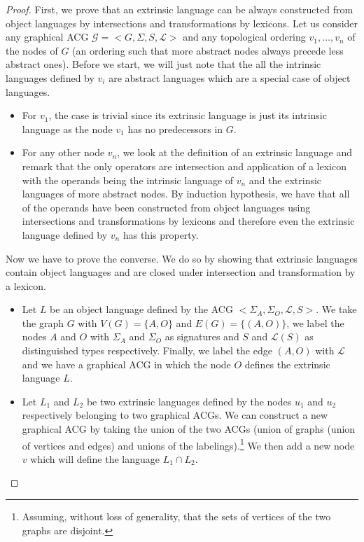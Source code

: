 \begin{proof}
  First, we prove that an extrinsic language can be always constructed
  from object languages by intersections and transformations by
  lexicons. Let us consider any graphical ACG $\mathcal{G} =
  \mathopen{<} G, \Sigma, S, \mathcal{L} \mathclose{>}$ and any
  topological ordering $v_1, \ldots, v_n$ of the nodes of $G$ (an
  ordering such that more abstract nodes always precede less abstract
  ones). Before we start, we will just note that the all the intrinsic
  languages defined by $v_i$ are abstract languages which are a special
  case of object languages.

  \begin{itemize}
    \item For $v_1$, the case is trivial since its extrinsic language is
      just its intrinsic language as the node $v_1$ has no predecessors
      in $G$.
    \item For any other node $v_n$, we look at the definition of an
      extrinsic language and remark that the only operators are
      intersection and application of a lexicon with the operands being
      the intrinsic language of $v_n$ and the extrinsic languages of
      more abstract nodes. By induction hypothesis, we have that all of
      the operands have been constructed from object languages using
      intersections and transformations by lexicons and therefore even
      the extrinsic language defined by $v_n$ has this property.
  \end{itemize}


  Now we have to prove the converse. We do so by showing that extrinsic
  languages contain object languages and are closed under intersection
  and transformation by a lexicon.

  \begin{itemize}
    \item Let $L$ be an object language defined by the ACG $\mathopen{<}
      \Sigma_A, \Sigma_O, \mathcal{L}, S\mathclose{>}$. We take the
      graph $G$ with $V(G) = \{A, O\}$ and $E(G) = \{(A,O)\}$, we label
      the nodes $A$ and $O$ with $\Sigma_A$ and $\Sigma_O$ as signatures
      and $S$ and $\mathcal{L}(S)$ as distinguished types
      respectively. Finally, we label the edge $(A,O)$ with
      $\mathcal{L}$ and we have a graphical ACG in which the node $O$
      defines the extrinsic language $L$.

    \item Let $L_1$ and $L_2$ be two extrinsic languages defined by the
      nodes $u_1$ and $u_2$ respectively belonging to two graphical
      ACGs. We can construct a new graphical ACG by taking the union of
      the two ACGs (union of graphs (union of vertices and edges) and
      unions of the labelings).\footnote{Assuming, without loss of
        generality, that the sets of vertices of the two graphs are
        disjoint.} We then add a new node $v$ which will define the
      language $L_1 \cap L_2$.


\end{itemize}
\end{proof}

